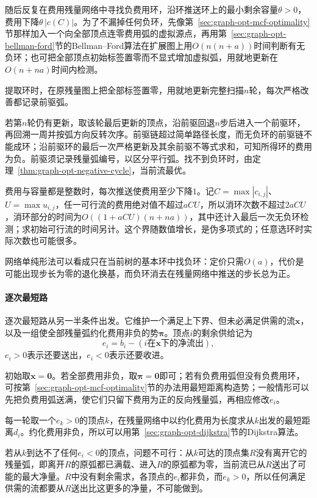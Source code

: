 随后反复在费用残量网络中寻找负费用环，沿环推送环上的最小剩余容量$\theta>0$，费用下降$\theta\,|c(C)|$。为了不漏掉任何负环，先像第~\ref{sec:graph-opt-mcf-optimality}节那样加入一个向全部顶点连零费用弧的虚拟源点，再用第~\ref{sec:graph-opt-bellman-ford}节的Bellman--Ford算法在扩展图上用$O(n(n+a))$时间判断有无负环；也可把全部顶点初始标签置零而不显式增加虚拟弧，用就地更新在$O(n+na)$时间内检测。

提取环时，在原残量图上把全部标签置零，用就地更新完整扫描$n$轮，每次严格改善都记录前驱弧。

若第$n$轮仍有更新，取该轮最后更新的顶点，沿前驱回退$n$步后进入一个前驱环，再回溯一周并按弧方向反转次序。前驱链超过简单路径长度，而无负环的前驱链不能成环；沿前驱环的最后一次严格更新及其余前驱不等式求和，可知所得环的费用为负。前驱须记录残量弧编号，以区分平行弧。找不到负环时，由定理~\ref{thm:graph-opt-negative-cycle}，当前流最优。

费用与容量都是整数时，每次推送使费用至少下降$1$。记$C=\max|c_{i,j}|$、$U=\max u_{i,j}$，任一可行流的费用绝对值不超过$aCU$，所以消环次数不超过$2aCU$，消环部分的时间为$O((1+aCU)(n+na))$，其中还计入最后一次无负环检测；求初始可行流的时间另计。这个界随数值增长，是伪多项式的；任意选环时实际次数也可能很多。

网络单纯形法可以看成只在当前树的基本环中找负环：定价只需$O(a)$，代价是可能出现步长为零的退化换基，而负环消去在残量网络中推送的步长总为正。

\paragraph{逐次最短路}
逐次最短路从另一半条件出发。它维护一个满足上下界、但未必满足供需的流$\bm x$，以及一组使全部残量弧约化费用非负的势$\bm\pi$。顶点$i$的剩余供给记为
\[
  e_i=b_i-(\text{$i$在$\bm x$下的净流出}),
\]
$e_i>0$表示还要送出，$e_i<0$表示还要收进。

初始取$\bm x=\bm 0$。若全部费用非负，取$\bm\pi=\bm 0$即可；若有负费用弧但没有负费用环，可按第~\ref{sec:graph-opt-mcf-optimality}节的办法用最短距离构造势；一般情形可以先把负费用弧送满，使它们只留下费用为正的反向残量弧，再相应修改$e_i$。

每一轮取一个$e_k>0$的顶点$k$，在残量网络中以约化费用为长度求从$k$出发的最短距离$d_i$。约化费用非负，所以可以用第~\ref{sec:graph-opt-dijkstra}节的Dijkstra算法。

若从$k$到达不了任何$e_i<0$的顶点，问题不可行：从$k$可达的顶点集$R$没有离开它的残量弧，即离开$R$的原弧都已满载、进入$R$的原弧都为零，当前流已从$R$送出了可能的最大净量。$R$中没有剩余需求，各顶点的$e_i$都非负，而$e_k>0$，所以任何满足供需的流都要从$R$送出比这更多的净量，不可能做到。

